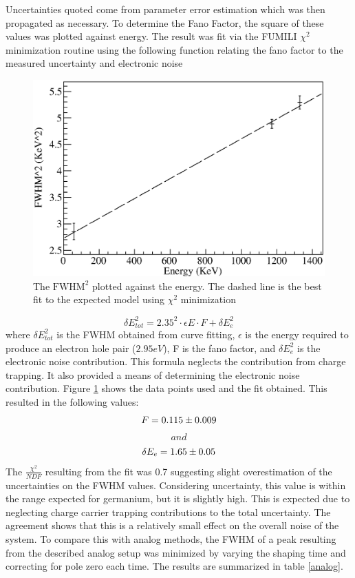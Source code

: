 \documentclass[twocolumn,preprintnumbers,superscriptaddress,amsmath,amssymb,floatfix]{revtex4-1}
\begin{document}
\noindent Uncertainties quoted come from parameter error estimation which was then propagated as necessary. To determine the Fano Factor, the square of these values was plotted against energy. The result was fit via the FUMILI $\chi^2$ minimization routine using the following function relating the fano factor to the measured uncertainty and electronic noise
\begin{figure}[b]
\includegraphics[width=.5\textwidth]{fano_factor_determination.eps}
\caption{The $\text{FWHM}^2$  plotted against the energy. The dashed line is the best fit to the expected model using $\chi^2$ minimization  
\label{fano}}
\end{figure}

\begin{equation}
\label{fano}
\delta E_{tot}^2 = 2.35^2 \cdot \epsilon E \cdot F+ \delta E_{e}^2
\end{equation} 
\noindent where $\delta E_{tot}^2$ is the FWHM obtained from curve fitting, $\epsilon$ is the energy required to produce an electron hole pair ($2.95 eV$), F is the fano factor, and $\delta E_{e}^2$ is the electronic noise contribution. This formula neglects the contribution from charge trapping. It also provided a means of determining the electronic noise contribution. Figure \ref{fano} shows the data points used and the fit obtained. This resulted in the following values:
\[
F = 0.115 \pm 0.009 \\
\]
\[and
\]
\[
\delta E_{e} = 1.65 \pm 0.05 \\ 
\]
The $\frac{\chi^2}{NDF}$ resulting from the fit was 0.7 suggesting slight overestimation of the uncertainties on the FWHM values. Considering uncertainty, this value is within the range expected for germanium, but it is slightly high. This is expected due to neglecting charge carrier trapping contributions to the total uncertainty. The agreement shows that this is a relatively small effect on the overall noise of the system.
To compare this with analog methods, the FWHM of a peak resulting from the described analog setup was minimized by varying the shaping time and correcting for pole zero each time. The results are summarized in table \ref{analog}. 
\end{document}
